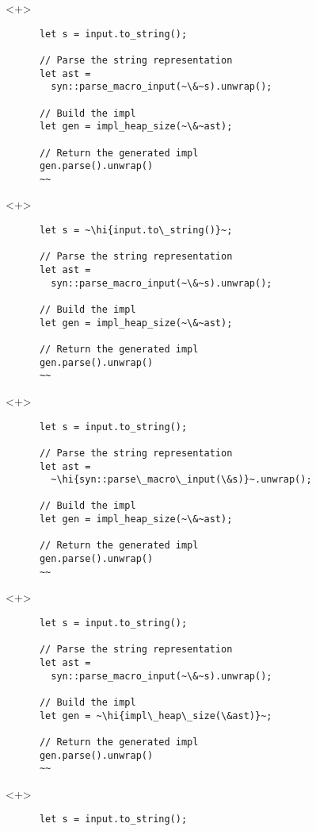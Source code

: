 \documentclass[usepdftitle=false]{beamer}
\renewcommand{\&}{\makebox[\widthof{\ampersand}][c]{\scalebox{0.9}[1.0]{\Book\ampersand}}}
\newcommand{\+}{\makebox[\widthof{+}][c]{\raisebox{-.2\height}{\scalefont{1.5}\Light+}}}
\newcommand{\hi}[1]{%
\tikz[baseline=(A.base)]
 \node[highlighting=0,inner sep=0pt,text depth=0pt] (A) {#1};%
}
\begin{document}
\begin{frame}[fragile]
  \begin{onlyenv}<+>
    \begin{verbatim}
      let s = input.to_string();

      // Parse the string representation
      let ast =
        syn::parse_macro_input(~\&~s).unwrap();

      // Build the impl
      let gen = impl_heap_size(~\&~ast);

      // Return the generated impl
      gen.parse().unwrap()
      ~~
    \end{verbatim}
  \end{onlyenv}
  \begin{onlyenv}<+>
    \begin{verbatim}
      let s = ~\hi{input.to\_string()}~;

      // Parse the string representation
      let ast =
        syn::parse_macro_input(~\&~s).unwrap();

      // Build the impl
      let gen = impl_heap_size(~\&~ast);

      // Return the generated impl
      gen.parse().unwrap()
      ~~
    \end{verbatim}
  \end{onlyenv}
  \begin{onlyenv}<+>
    \begin{verbatim}
      let s = input.to_string();

      // Parse the string representation
      let ast =
        ~\hi{syn::parse\_macro\_input(\&s)}~.unwrap();

      // Build the impl
      let gen = impl_heap_size(~\&~ast);

      // Return the generated impl
      gen.parse().unwrap()
      ~~
    \end{verbatim}
  \end{onlyenv}
  \begin{onlyenv}<+>
    \begin{verbatim}
      let s = input.to_string();

      // Parse the string representation
      let ast =
        syn::parse_macro_input(~\&~s).unwrap();

      // Build the impl
      let gen = ~\hi{impl\_heap\_size(\&ast)}~;

      // Return the generated impl
      gen.parse().unwrap()
      ~~
    \end{verbatim}
  \end{onlyenv}
  \begin{onlyenv}<+>
    \begin{verbatim}
      let s = input.to_string();


\end{verbatim}
\end{onlyenv}
\end{frame}
\end{document}
